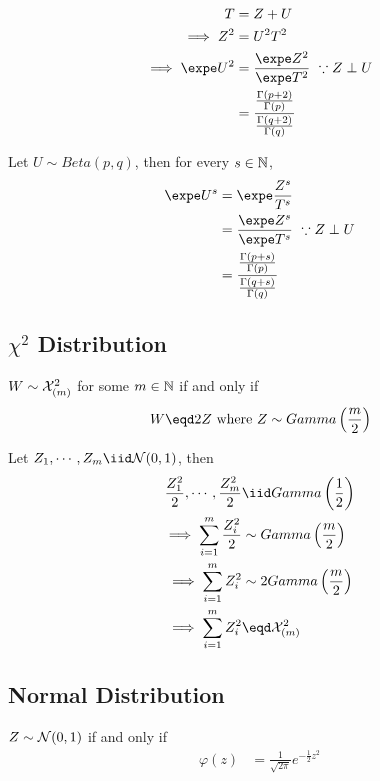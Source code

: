 \documentclass{article}
\begin{document}
	\begin{theorem}
		\begin{align}
			T &= Z + U \\
			\implies Z^2	 &= U^2 T^2 \\
			\implies \expe U^2 &= \frac{\expe Z^2}{\expe T^2}\ \because Z \perp U \\
			&= \frac{\frac{\Gamma(p+2)}{\Gamma(p)}}
			{\frac{\Gamma(q+2)}{{\Gamma(q)}}}
		\end{align}
	\end{theorem}
	
	\begin{theorem}
		Let $U \sim Beta(p, q)$, then for every $s \in \mathbb{N}$,
		\begin{align}
			\expe U^s &= \expe \frac{Z^s}{T^s} \\
			&= \frac{\expe Z^s}{\expe T^s}\ \because Z \perp U \\
			&= \frac{
			\frac{\Gamma(p+s)}{\Gamma(p)}
			}{
			\frac{\Gamma(q+s)}{\Gamma(q)}
			}
		\end{align}
	\end{theorem}
	
   	\subsection{$\chi^2$ Distribution}
 	\begin{definition}
 		$W \sim \mathcal{{X}}^2_{(m)}$ for some $m \in \mathbb{N}$ if and only if 
 		\begin{align}
 			W \eqd 2Z \tx{ where } Z \sim Gamma\left(\frac{m}{2}\right)
 		\end{align}
 	\end{definition}
 	
 	\begin{theorem}
 		Let $Z_1, \cdots, Z_m \iid \mc{N}(0, 1)$, then 
 		\begin{align}
 			\frac{Z_1^2}{2}, \cdots, \frac{Z_m^2}{2} &\iid Gamma\left(\frac{1}{2}\right) \\
 			\implies \sum_{i=1}^m \frac{Z_i^2}{2} &\sim Gamma\left(\frac{m}{2}\right) \\
 			\implies \sum_{i=1}^m Z_i^2 &\sim 2 Gamma\left(\frac{m}{2}\right) \\
 			\implies \sum_{i=1}^m Z_i^2
 			&\eqd \mc{X}_{(m)}^2
 		\end{align}
 	\end{theorem}
 	
 	\subsection{Normal Distribution}
 	\begin{definition}[Defintion 1]
 		$Z \sim \mathcal{{N}}(0, 1)$ if and only if
 		\begin{align}
 			\varphi(z) &= \frac{1}{\sqrt{2\pi}} e^{-\frac{1}{2}z^2}
 		\end{align}
 	\end{definition}
 	
\end{document}
